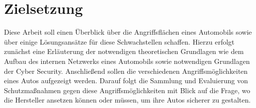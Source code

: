 \section{Zielsetzung}
Diese Arbeit soll einen Überblick über die Angriffsflächen eines Automobils sowie über einige Lösungsansätze für diese Schwachstellen schaffen. Hierzu erfolgt zunächst eine Erläuterung der notwendigen theoretischen Grundlagen wie dem Aufbau des internen Netzwerks eines Automobils sowie notwendigen Grundlagen der Cyber Security. Anschließend sollen die verschiedenen Angriffsmöglichkeiten eines Autos aufgezeigt werden. Darauf folgt die Sammlung und Evaluierung von Schutzmaßnahmen gegen diese Angriffsmöglichkeiten mit Blick auf die Frage, wo die Hersteller ansetzen können oder müssen, um ihre Autos sicherer zu gestalten.